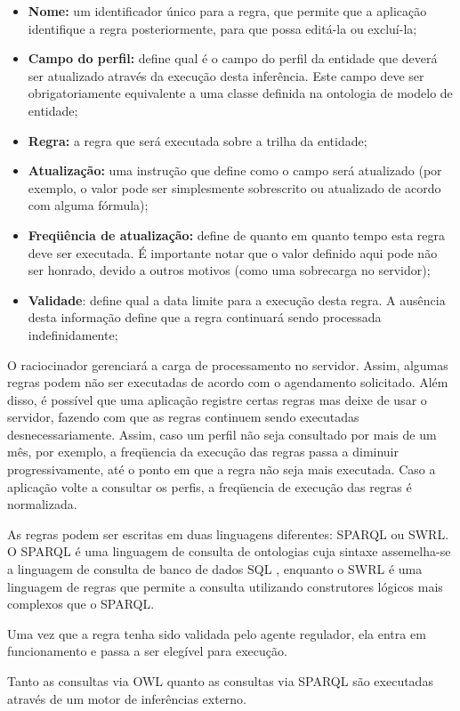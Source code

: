 \begin{itemize}

\item {\bf Nome:} um identificador único para a regra, que permite que a aplicação identifique a regra posteriormente, para que possa editá-la ou excluí-la;

\item {\bf Campo do perfil:} define qual é o campo do perfil da entidade que deverá ser atualizado através da execução desta inferência. Este campo deve ser obrigatoriamente equivalente a uma classe definida na ontologia de modelo de entidade;

\item {\bf Regra:} a regra que será executada sobre a trilha da entidade;

\item {\bf Atualização:} uma instrução que define como o campo será atualizado (por exemplo, o valor pode ser simplesmente sobrescrito ou atualizado de acordo com alguma fórmula);

\item {\bf Freqüência de atualização:} define de quanto em quanto tempo esta regra deve ser executada. É importante notar que o valor definido aqui pode não ser honrado, devido a outros motivos (como uma sobrecarga no servidor);

\item {\bf Validade}: define qual a data limite para a execução desta regra. A ausência desta informação define que a regra continuará sendo processada indefinidamente;

\end{itemize}

O raciocinador gerenciará a carga de processamento no servidor. Assim, algumas regras podem não ser executadas de acordo com o agendamento solicitado. Além disso, é possível que uma aplicação registre certas regras mas deixe de usar o servidor, fazendo com que as regras continuem sendo executadas desnecessariamente. Assim, caso um perfil não seja consultado por mais de um mês, por exemplo, a freqüencia da execução das regras passa a diminuir progressivamente, até o ponto em que a regra não seja mais executada. Caso a aplicação volte a consultar os perfis, a freqüencia de execução das regras é normalizada.

As regras podem ser escritas em duas linguagens diferentes: SPARQL ou SWRL. O SPARQL \cite{sparql} é uma linguagem de consulta de ontologias cuja sintaxe assemelha-se a linguagem de consulta de banco de dados SQL \cite{sql}, enquanto o SWRL \cite{swrl} é uma linguagem de regras que permite a consulta utilizando construtores lógicos mais complexos que o SPARQL.

Uma vez que a regra tenha sido validada pelo agente regulador, ela entra em funcionamento e passa a ser elegível para execução.

Tanto as consultas via OWL quanto as consultas via SPARQL são executadas através de um motor de inferências externo. 

